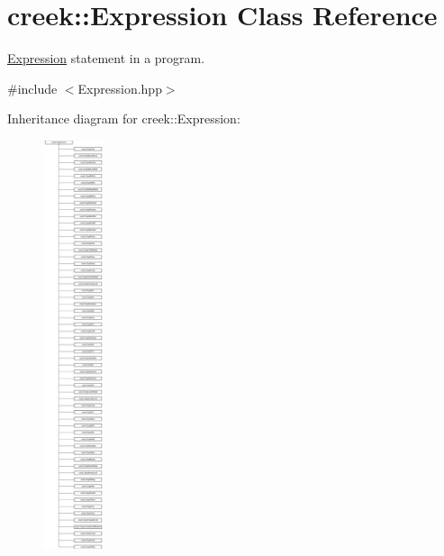 \hypertarget{classcreek_1_1_expression}{}\section{creek\+:\+:Expression Class Reference}
\label{classcreek_1_1_expression}


\hyperlink{classcreek_1_1_expression}{Expression} statement in a program.  




{\ttfamily \#include $<$Expression.\+hpp$>$}

Inheritance diagram for creek\+:\+:Expression\+:\begin{figure}[H]
\begin{center}
\leavevmode
\includegraphics[height=12.000000cm]{classcreek_1_1_expression}
\end{center}
\end{figure}
